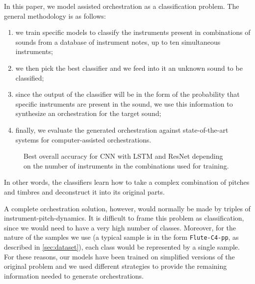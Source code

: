 \documentclass{article}
\begin{document}
In this paper, we model assisted orchestration as a classification problem. The general methodology is as follows:
\begin{enumerate}
\item we train specific models to classify the instruments present in combinations of sounds from a database of instrument notes, up to ten simultaneous instruments;
\item we then pick the best classifier and we feed into it an unknown sound to be classified;
\item since the output of the classifier will be in the form of the probability that specific instruments are present in the sound, we use this information to synthesize an orchestration for the target sound;
\item finally, we evaluate the generated orchestration against state-of-the-art systems for computer-assisted orchestrations.
\end{enumerate}

\begin{figure}
\caption{Best overall accuracy for CNN with LSTM and ResNet depending on the number of instruments in the combinations used for training. \label{cnn_vs_resnet}}
\end{figure}

In other words, the classifiers learn how to take a complex combination of pitches and timbres and deconstruct it into its original parts.

A complete orchestration solution, however, would normally be made by triples of instrument-pitch-dynamics. It is difficult to frame this problem as classification, since we would need to have a very high number of classes. Moreover, for the nature of the samples we use (a typical sample is in the form \texttt{Flute-C4-pp}, as described in \ref{sec:dataset}), each class would be represented by a single sample. For these reasons, our models have been trained on simplified versions of the original problem and we used different strategies to provide the remaining information needed to generate orchestrations.
\end{document}
